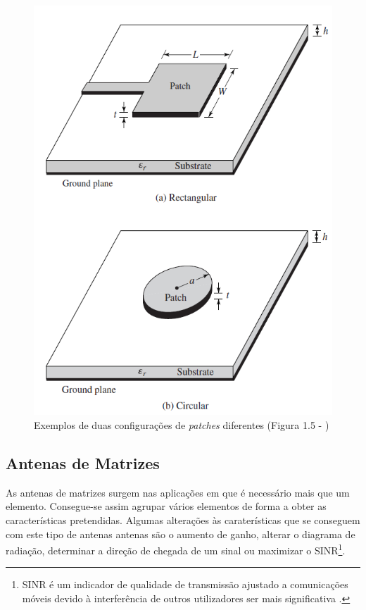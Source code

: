 \begin{figure}[h]
\centering
\includegraphics[scale=0.6]{chapters/ch3/assets/microstrip}
\caption[Antena \textit{Microstrip}]{Exemplos de duas configurações de \textit{patches} diferentes (Figura 1.5 - \cite{Balanis2016})}
\label{fig:microstrip}
\end{figure}

\subsection*{Antenas de Matrizes}
As antenas de matrizes surgem nas aplicações em que é necessário mais que um elemento. Consegue-se assim agrupar vários elementos de forma a obter as características pretendidas. Algumas alterações às caraterísticas que se conseguem com este tipo de antenas antenas são o aumento de ganho, alterar o diagrama de radiação, determinar a direção de chegada de um sinal ou maximizar o \gls{SINR}\footnote{\gls{SINR} é um indicador de qualidade de transmissão ajustado a comunicações móveis devido à interferência de outros utilizadores ser mais significativa \parencite{Jeske2004}.}.

